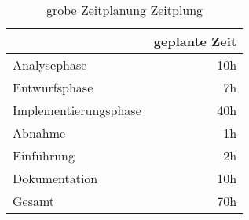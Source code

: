 \begin{table}[h]
\centering
\begin{tabular}{lr}
\rowcolor{gragreen}\multicolumn{1}{l}{\bf{Projektphase}}  & \multicolumn{1}{l}{\bf{geplante Zeit}} \\
\hline
Analysephase   & 10h \\

\rowcolor{odd}Entwurfsphase   & 7h \\

Implementierungsphase  &  40h \\

\rowcolor{odd}Abnahme &   1h \\
Einführung   & 2h \\
\rowcolor{odd}Dokumentation   & 10h \\

\hline
\rowcolor{heading}Gesamt  & 70h
\end{tabular}
\caption{grobe Zeitplanung Zeitplung}
\label{table:overviewtimetable}
\end{table}